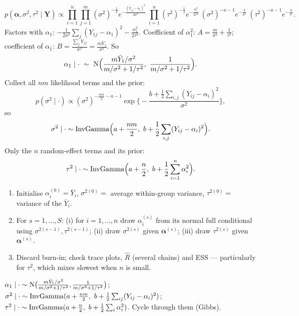 \documentclass[11pt]{article}
\begin{document}
\solution
{}
\[
p(\bm\alpha,\sigma^2,\tau^2\mid\mathbf Y)\propto\prod_{i=1}^n\prod_{j=1}^m(\sigma^2)^{-\frac12}e^{-\frac{(Y_{ij}-\alpha_i)^2}{2\sigma^2}}\ \prod_{i=1}^n(\tau^2)^{-\frac12}e^{-\frac{\alpha_i^2}{2\tau^2}}\ (\sigma^2)^{-a-1}e^{-\frac b{\sigma^2}}\ (\tau^2)^{-a-1}e^{-\frac b{\tau^2}}.
\]
 Factors with $\alpha_1$: $-\frac{1}{2\sigma^2}\sum_j(Y_{1j}-\alpha_1)^2-\frac{\alpha_1^2}{2\tau^2}$. Coefficient of $\alpha_1^2$: $A=\frac m{\sigma^2}+\frac1{\tau^2}$; coefficient of $\alpha_1$: $B=\frac{\sum_jY_{1j}}{\sigma^2}=\frac{m\bar Y_1}{\sigma^2}$. So
\[
\alpha_1\mid\cdot\ \sim\ \dist N\Big(\frac{m\bar Y_1/\sigma^2}{m/\sigma^2+1/\tau^2},\ \frac{1}{m/\sigma^2+1/\tau^2}\Big).
\]
 Collect all $nm$ likelihood terms and the prior:
\[
p(\sigma^2\mid\cdot)\propto(\sigma^2)^{-\frac{nm}2-a-1}\exp\Big\{-\frac{b+\frac12\sum_{i,j}(Y_{ij}-\alpha_i)^2}{\sigma^2}\Big\},
\]
so
\[
\sigma^2\mid\cdot\sim\dist{InvGamma}\Big(a+\frac{nm}{2},\ b+\frac12\sum_{i,j}(Y_{ij}-\alpha_i)^2\Big).
\]
 Only the $n$ random-effect terms and its prior:
\[
\tau^2\mid\cdot\sim\mathrm{InvGamma}\Big(a+\frac n2,\ b+\frac12\sum_{i=1}^n\alpha_i^2\Big).
\]
\begin{enumerate}[1.]
\item Initialise $\alpha_i^{(0)}=\bar Y_i$, $\sigma^{2(0)}=$ average within-group variance, $\tau^{2(0)}=$ variance of the $\bar Y_i$.
\item For $s=1,\dots,S$: (i) for $i=1,\dots,n$ draw $\alpha_i^{(s)}$ from its normal full conditional using $\sigma^{2(s-1)},\tau^{2(s-1)}$; (ii) draw $\sigma^{2(s)}$ given $\bm\alpha^{(s)}$; (iii) draw $\tau^{2(s)}$ given $\bm\alpha^{(s)}$.
\item Discard burn-in; check trace plots, $\hat R$ (several chains) and ESS --- particularly for $\tau^2$, which mixes slowest when $n$ is small.
\end{enumerate}

\begin{answer}
$\alpha_1\mid\cdot\sim\mathrm{N}\big(\frac{m\bar Y_1/\sigma^2}{m/\sigma^2+1/\tau^2},\frac1{m/\sigma^2+1/\tau^2}\big)$; $\sigma^2\mid\cdot\sim\dist{InvGamma}(a+\frac{nm}2,\ b+\frac12\sum_{ij}(Y_{ij}-\alpha_i)^2)$; $\tau^2\mid\cdot\sim\dist{InvGamma}(a+\frac n2,\ b+\frac12\sum_i\alpha_i^2)$. Cycle through them (Gibbs).
\end{answer}
\end{document}
